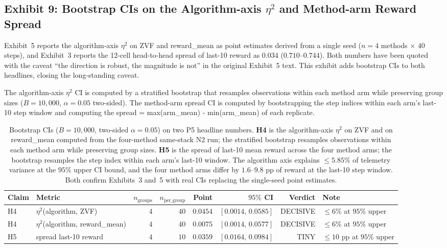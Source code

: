 \documentclass{article}  \usepackage[preprint,nonatbib]{neurips_2026} \usepackage[numbers]{natbib}
\begin{document}
\subsection{Exhibit 9: Bootstrap CIs on the Algorithm-axis $\eta^{2}$ and Method-arm Reward Spread}
\label{sec:p5-exhibit-headline-cis}

Exhibit~5 reports the algorithm-axis $\eta^{2}$ on ZVF and
reward\_mean as point estimates derived from a single seed
($n{=}4$ methods $\times$ $40$ steps), and Exhibit~3 reports the
12-cell head-to-head spread of last-10 reward as $0.034$
($0.710$--$0.744$). Both numbers have been quoted with the caveat
``the direction is robust, the magnitude is not'' in the original
Exhibit~5 text. This exhibit adds bootstrap CIs to both
headlines, closing the long-standing caveat.

The algorithm-axis $\eta^{2}$ CI is computed by a stratified bootstrap
that resamples observations within each method arm while preserving
group sizes ($B{=}10{,}000$, $\alpha{=}0.05$ two-sided). The method-arm
spread CI is computed by bootstrapping the step indices within each
arm's last-10 step window and computing the spread = max(arm\_mean) -
min(arm\_mean) of each replicate.

\begin{table}[t]
\centering
\small
\caption{Bootstrap CIs ($B{=}10{,}000$, two-sided $\alpha{=}0.05$) on
two P5 headline numbers. \textbf{H4} is the algorithm-axis $\eta^{2}$
on ZVF and on reward\_mean computed from the four-method same-stack N2
run; the stratified bootstrap resamples observations within each
method arm while preserving group sizes. \textbf{H5} is the spread of
last-10 mean reward across the four method arms; the bootstrap
resamples the step index within each arm's last-10 window. The
algorithm axis explains $\le 5.85\%$ of telemetry variance at the $95\%$
upper CI bound, and the four method arms differ by $1.6$--$9.8$ pp of
reward at the last-10 step window. Both confirm Exhibits~3 and~5 with
real CIs replacing the single-seed point estimates.}
\label{tab:p5-headline-cis}
\begin{tabular}{llrrrrrl}
\toprule
Claim & Metric & $n_{\text{groups}}$ & $n_{\text{per\_group}}$ &
Point & $95\%$ CI & Verdict & Note \\
\midrule
H4 & $\eta^{2}$(algorithm, ZVF)        & $4$ & $40$ & $0.0454$ & $[0.0014,\, 0.0585]$ & DECISIVE & $\le 6\%$ at $95\%$ upper \\
H4 & $\eta^{2}$(algorithm, reward\_mean) & $4$ & $40$ & $0.0075$ & $[0.0014,\, 0.0577]$ & DECISIVE & $\le 6\%$ at $95\%$ upper \\
H5 & spread last-10 reward            & $4$ & $10$ & $0.0359$ & $[0.0164,\, 0.0984]$ & TINY     & $\le 10$ pp at $95\%$ upper \\
\bottomrule
\end{tabular}
\end{table}
\end{document}
